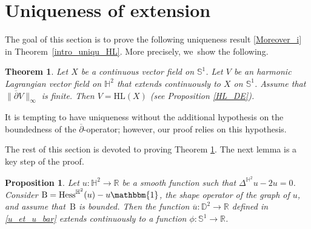 \documentclass[JEP,XML,SOM,Unicode,NoEqCountersInSection, NoFloatCountersInSection,published]{cedram}
\theoremstyle{plain}
\newtheorem{theorem}[cor]{Theorem}
\newtheorem{prop}[cor]{Proposition}
\theoremstyle{definition}
\newcommand{\hess}{\mathrm{Hess}^{\mathbb{H}^2}}
\newcommand{\B}{\mathrm{B}}
\begin{document}
\section{Uniqueness of extension}\label{sec_uniquness}
The goal of this section is to prove the following uniqueness result \eqref{Moreover_i} in Theorem~\ref{intro_uniqu_HL}. More precisely, we~show the following.

\begin{theorem}\label{uniqTH1HL}
Let $X$ be a continuous vector field on $\mathbb{S}^1$. Let $V$ be an harmonic Lagrangian vector field on $\mathbb{H}^2$ that extends continuously to $X$ on $\mathbb{S}^1$. Assume that $\lVert \overline{\partial}V\rVert_{\infty}$ is finite. Then $V=\mathrm{HL}(X)$ (see Proposition \ref{HL_DE}).
\end{theorem}
It is tempting to have uniqueness without the additional hypothesis on the boundedness of the $\overline{\partial}$-operator; however, our proof relies on this hypothesis.

The rest of this section is devoted to proving Theorem \ref{uniqTH1HL}. The next lemma is a key step of the proof.

\begin{prop}\label{zygumund_imply_extension}
Let \(u: \mathbb{H}^2 \to \mathbb{R} \) be a smooth function such that \(\Delta^{\mathbb{H}^2} u - 2u = 0 \). Consider \(\B = \hess(u) - u \mathbbm{1} \), the shape operator of the graph of \(u \), and assume that~\(\B \) is bounded. Then the function \(\overline{u}: \mathbb{D}^2 \to \mathbb{R} \) defined in \eqref{u_et_u_bar} extends continuously to a function \(\phi: \mathbb{S}^1 \to \mathbb{R} \).
\end{prop}
\end{document}
